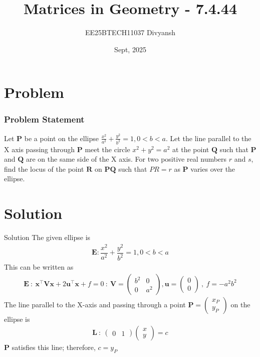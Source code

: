 \documentclass{beamer}
\title{Matrices in Geometry - 7.4.44}
\author{EE25BTECH11037  Divyansh}
\date{Sept, 2025}
\let\vec\mathbf
\theoremstyle{remark}
\newcommand{\myvec}[1]{\ensuremath{\begin{pmatrix}#1\end{pmatrix}}}
\begin{document}
\maketitle


\section{Problem}
\begin{frame}
\frametitle{Problem Statement}
Let $\vec{P}$ be a point on the ellipse $\frac{x^2}{a^2} + \frac{y^2}{b^2}=1 , 0<b<a$. Let the line parallel to the X axis passing through $\vec{P}$ meet the circle $x^2 + y^2= a^2$ at the point $\vec{Q}$ such that $\vec{P}$ and $\vec{Q}$ are on the same side of the X axis. For two positive real numbers $r$ and $s$, find the locus of the point $\vec{R}$ on $\vec{P}\vec{Q}$ such that $PR = r$ as $\vec{P}$ varies over the ellipse.
\end{frame}

\section{Solution}
\begin{frame}{Solution}
The given ellipse is 
\begin{align}
    \vec{E} : \dfrac{x^2}{a^2} + \dfrac{y^2}{b^2} =1, 0<b<a
\end{align}
This can be written as
\begin{align}
    \vec{E} \ : \ \vec{x}^{\top}\vec{V}\vec{x} + 2 \vec{u}^{\top}\vec{x} + f=0 \ : \ \vec{V}=\myvec{b^2 & 0 \\ 0 & a^2}, \vec{u}=\myvec{0\\0}\ , \ f=-a^2b^2 
\end{align}
The line parallel to the X-axis and passing through a point $\vec{P}=\myvec{x_P \\ y_P}$ on the ellipse is 
\begin{align}
    \vec{L}\ :\ \myvec{0&1}\myvec{x\\y}=c
\end{align}
$\vec{P}$ satisfies this line; therefore, $c=y_P$

\end{frame}
\end{document}
